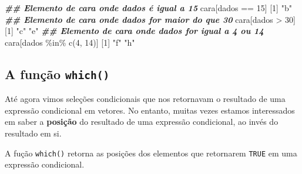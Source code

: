 \documentclass[
  10pt,
  a4paper]{book}
\newenvironment{Shaded}{\begin{snugshade}}{\end{snugshade}}
\newcommand{\DecValTok}[1]{\textcolor[rgb]{0.00,0.00,0.81}{#1}}
\newcommand{\DocumentationTok}[1]{\textcolor[rgb]{0.56,0.35,0.01}{\textbf{\textit{#1}}}}
\newcommand{\FunctionTok}[1]{\textcolor[rgb]{0.00,0.00,0.00}{#1}}
\newcommand{\NormalTok}[1]{#1}
\newcommand{\SpecialCharTok}[1]{\textcolor[rgb]{0.00,0.00,0.00}{#1}}
\newcommand{\StringTok}[1]{\textcolor[rgb]{0.31,0.60,0.02}{#1}}
\begin{document}
\begin{Shaded}
\begin{Highlighting}[]
\DocumentationTok{\#\# Elemento de cara onde dados é igual a 15}
\NormalTok{cara[dados }\SpecialCharTok{==} \DecValTok{15}\NormalTok{]}
\NormalTok{[}\DecValTok{1}\NormalTok{] }\StringTok{"b"}
\DocumentationTok{\#\# Elemento de cara onde dados for maior do que 30}
\NormalTok{cara[dados }\SpecialCharTok{\textgreater{}} \DecValTok{30}\NormalTok{]}
\NormalTok{[}\DecValTok{1}\NormalTok{] }\StringTok{"c"} \StringTok{"e"}
\DocumentationTok{\#\# Elemento de cara onde dados for igual a 4 ou 14}
\NormalTok{cara[dados }\SpecialCharTok{\%in\%} \FunctionTok{c}\NormalTok{(}\DecValTok{4}\NormalTok{, }\DecValTok{14}\NormalTok{)]}
\NormalTok{[}\DecValTok{1}\NormalTok{] }\StringTok{"f"} \StringTok{"h"}
\end{Highlighting}
\end{Shaded}

\hypertarget{a-funuxe7uxe3o-which}{%
\subsection{\texorpdfstring{A função \texttt{which()}}{A função which()}}\label{a-funuxe7uxe3o-which}}

Até agora vimos seleções condicionais que nos retornavam o resultado de
uma expressão condicional em vetores. No entanto, muitas vezes estamos
interessados em saber a \textbf{posição} do resultado de uma expressão
condicional, ao invés do resultado em si.

A fução \texttt{which()} retorna as posições dos elementos que retornarem
\texttt{TRUE} em uma expressão condicional.
\end{document}
